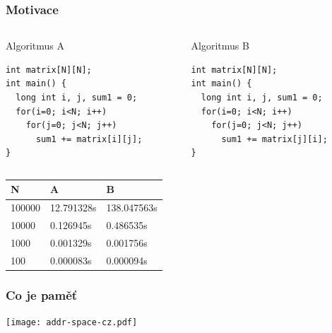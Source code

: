 \documentclass{beamer}
\begin{document}
\begin{frame}[fragile]
\frametitle{Motivace}

\begin{columns}
\begin{column}{0.45\textwidth}
Algoritmus A\\
\begin{verbatim}
int matrix[N][N];
int main() {
  long int i, j, sum1 = 0;
  for(i=0; i<N; i++)
    for(j=0; j<N; j++)
      sum1 += matrix[i][j];
}
\end{verbatim}
\end{column}
\hfill
\begin{column}{0.45\textwidth}
Algoritmus B\\
\begin{verbatim}
int matrix[N][N];
int main() {
  long int i, j, sum1 = 0;
  for(i=0; i<N; i++)
    for(j=0; j<N; j++)
      sum1 += matrix[j][i];
}
\end{verbatim}
\end{column}
\end{columns}
\bigskip

\begin{tabular}{|l|l|l|}\hline
N & A & B \\\hline
100000 & 12.791328s &138.047563s \\\hline
10000 & 0.126945s &0.486535s \\\hline
1000 & 0.001329s &0.001756s \\\hline
100 & 0.000083s &0.000094s \\\hline
\end{tabular}
\end{frame}

\begin{frame}
\frametitle{Co je paměť}

\centering

\texttt{[image: addr-space-cz.pdf]}

\end{frame}
\end{document}
